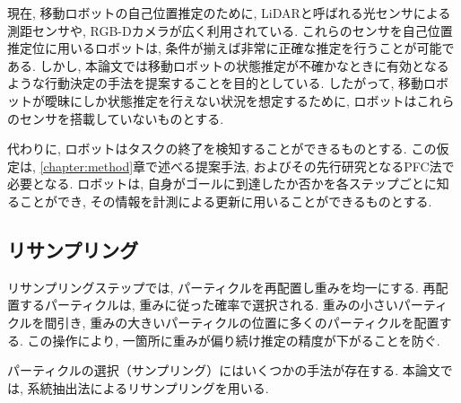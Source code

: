 現在, 移動ロボットの自己位置推定のために, LiDARと呼ばれる光センサによる測距センサや, RGB-Dカメラが広く利用されている. 
これらのセンサを自己位置推定位に用いるロボットは, 条件が揃えば非常に正確な推定を行うことが可能である. 
しかし, 本論文では移動ロボットの状態推定が不確かなときに有効となるような行動決定の手法を提案することを目的としている. 
したがって, 移動ロボットが曖昧にしか状態推定を行えない状況を想定するために, ロボットはこれらのセンサを搭載していないものとする. 

代わりに, ロボットはタスクの終了を検知することができるものとする. 
この仮定は, \ref{chapter:method}章で述べる提案手法, およびその先行研究となるPFC法で必要となる. 
ロボットは, 自身がゴールに到達したか否かを各ステップごとに知ることができ, その情報を計測による更新に用いることができるものとする. 

\subsection{リサンプリング}
リサンプリングステップでは, パーティクルを再配置し重みを均一にする. 
再配置するパーティクルは, 重みに従った確率で選択される. 
重みの小さいパーティクルを間引き, 重みの大きいパーティクルの位置に多くのパーティクルを配置する. 
この操作により, 一箇所に重みが偏り続け推定の精度が下がることを防ぐ. 

パーティクルの選択（サンプリング）にはいくつかの手法が存在する. 
本論文では, 系統抽出法によるリサンプリングを用いる. 
